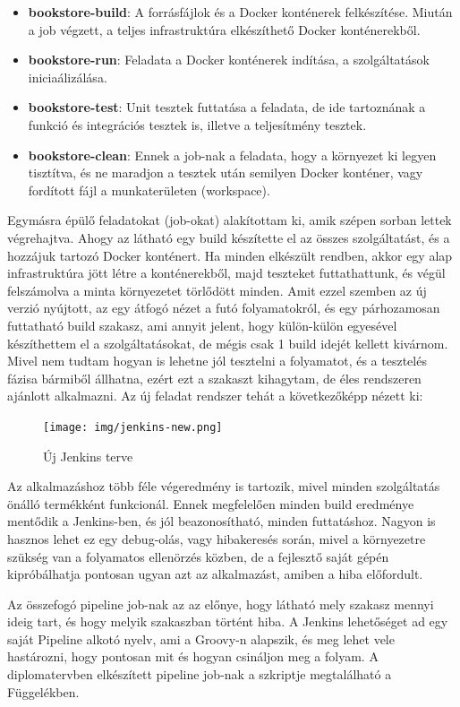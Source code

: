 \documentclass[11pt,magyar,a4paper,twoside,]{report}
\providecommand{\tightlist}{%
  \setlength{\itemsep}{0pt}\setlength{\parskip}{0pt}}
\begin{document}
\begin{itemize}
\tightlist
\item
  \textbf{bookstore-build}: A forrásfájlok és a Docker konténerek
  felkészítése. Miután a job végzett, a teljes infrastruktúra
  elkészíthető Docker konténerekből.
\item
  \textbf{bookstore-run}: Feladata a Docker konténerek indítása, a
  szolgáltatások iniciaálizálása.
\item
  \textbf{bookstore-test}: Unit tesztek futtatása a feladata, de ide
  tartoznának a funkció és integrációs tesztek is, illetve a
  teljesítmény tesztek.
\item
  \textbf{bookstore-clean}: Ennek a job-nak a feladata, hogy a környezet
  ki legyen tisztítva, és ne maradjon a tesztek után semilyen Docker
  konténer, vagy fordított fájl a munkaterületen (workspace).
\end{itemize}

Egymásra épülő feladatokat (job-okat) alakítottam ki, amik szépen sorban
lettek végrehajtva. Ahogy az látható egy build készítette el az összes
szolgáltatást, és a hozzájuk tartozó Docker konténert. Ha minden
elkészült rendben, akkor egy alap infrastruktúra jött létre a
konténerekből, majd teszteket futtathattunk, és végül felszámolva a
minta környezetet törlődött minden. Amit ezzel szemben az új verzió
nyújtott, az egy átfogó nézet a futó folyamatokról, és egy párhozamosan
futtatható build szakasz, ami annyit jelent, hogy külön-külön egyesével
készíthettem el a szolgáltatásokat, de mégis csak 1 build idejét kellett
kivárnom. Mivel nem tudtam hogyan is lehetne jól tesztelni a folyamatot,
és a tesztelés fázisa bármiből állhatna, ezért ezt a szakaszt kihagytam,
de éles rendszeren ajánlott alkalmazni. Az új feladat rendszer tehát a
következőképp nézett ki:

\begin{figure}[H]
\centering
\texttt{[image: img/jenkins-new.png]}
\caption{Új Jenkins terve}
\end{figure}

Az alkalmazáshoz több féle végeredmény is tartozik, mivel minden
szolgáltatás önálló termékként funkcionál. Ennek megfelelően minden
build eredménye mentődik a Jenkins-ben, és jól beazonosítható, minden
futtatáshoz. Nagyon is hasznos lehet ez egy debug-olás, vagy hibakeresés
során, mivel a környezetre szükség van a folyamatos ellenörzés közben,
de a fejlesztő saját gépén kipróbálhatja pontosan ugyan azt az
alkalmazást, amiben a hiba előfordult.

Az összefogó pipeline job-nak az az előnye, hogy látható mely szakasz
mennyi ideig tart, és hogy melyik szakaszban történt hiba. A Jenkins
lehetőséget ad egy saját Pipeline alkotó nyelv, ami a Groovy-n alapszik,
és meg lehet vele hastározni, hogy pontosan mit és hogyan csináljon meg
a folyam. A diplomatervben elkészített pipeline job-nak a szkriptje
megtalálható a Függelékben.
\end{document}
